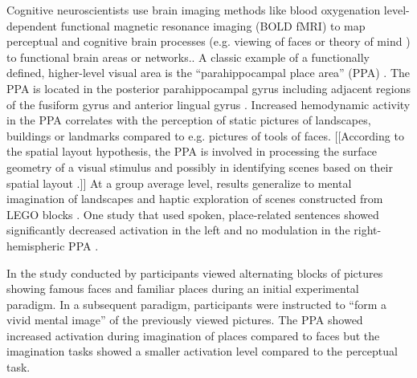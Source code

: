 \documentclass[english]{article}
\begin{document}

Cognitive neuroscientists use brain imaging methods like blood oxygenation
level-dependent functional magnetic resonance imaging (BOLD fMRI) to map
perceptual and cognitive brain processes (e.g. viewing of faces
\citep{kanwisher1997ffa} or theory of mind \citep{spunt2014validating}) to
functional brain areas or networks..
A classic example of a functionally defined, higher-level visual area is the
``parahippocampal place area'' (PPA) \citep{epstein1998ppa,
epstein1999parahippocampal}.
The PPA is located in the posterior parahippocampal gyrus including adjacent
regions of the fusiform gyrus and anterior lingual gyrus
\citep{epstein2008parahippocampal}.
Increased hemodynamic activity in the PPA correlates with the perception of
static pictures of landscapes, buildings or landmarks \citep{aguirre1998area,
epstein2014neural, epstein1998ppa} compared to e.g. pictures of tools of faces.
[[According to the spatial layout hypothesis, the PPA is involved in processing
the surface geometry of a visual stimulus and possibly in identifying scenes
based on their spatial layout \citep{epstein2010reliable}.]]
At a group average level, results generalize  to mental imagination of landscapes
\citep{ocraven2000mental} and haptic exploration of scenes constructed from LEGO
blocks \citep{wolbers2011modality}.
One study that used spoken, place-related sentences showed significantly
decreased activation in the left and no modulation in the right-hemispheric PPA
\citep{aziz2008modulation}.

In the study conducted by \cite{ocraven2000mental} participants viewed
alternating blocks of pictures showing famous faces and familiar places during
an initial experimental paradigm. In a subsequent paradigm, participants were
instructed to ``form a vivid mental image'' of the previously viewed pictures.
The PPA showed increased activation during imagination of places compared to
faces but the imagination tasks showed a smaller activation level compared to
the perceptual task.
\end{document}
